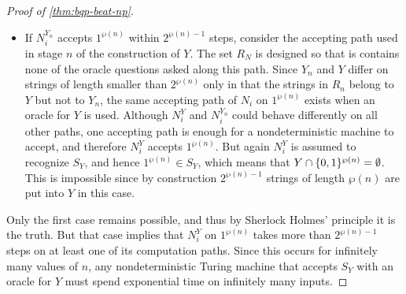 \documentclass[12pt]{article}
\begin{document}
\begin{mdframed}
\begin{proof}[Proof of \cref{thm:bqp-beat-np}]
\begin{itemize}
      which means that $Y \cap \zo^{\wp(n)} \ne \emptyset$. This is impossible
      since by construction no strings of length $\wp(n)$ are put into $Y$ in
      this case.
    \item If $N_i^{Y_n}$ accepts $1^{\wp(n)}$ within $2^{\wp(n)-1}$ steps,
      consider the accepting path used in stage $n$ of the construction of $Y$.
      The set $R_N$ is designed so that is contains none of the oracle questions
      asked along this path. Since $Y_n$ and $Y$ differ on strings of length
      smaller than $2^{\wp(n)}$ only in that the strings in $R_n$ belong to $Y$
      but not to $Y_n$, the same accepting path of $N_i$ on $1^{\wp(n)}$ exists
      when an oracle for $Y$ is used. Although $N_i^Y$ and $N_i^{Y_n}$ could
      behave differently on all other paths, one accepting path is enough for a
      nondeterministic machine to accept, and therefore $N_i^Y$ accepts
      $1^{\wp(n)}$. But again $N_i^Y$ is assumed to recognize $S_Y$, and hence
      $1^{\wp(n)} \in S_Y$, which means that $Y \cap \{0,1\}^{\wp(n)} = \emptyset$.
      This is impossible since by construction $2^{\wp(n)-1}$ strings of length
      $\wp(n)$ are put into $Y$ in this case.
  \end{itemize}
  Only the first case remains possible, and thus by Sherlock Holmes' principle
  it is the truth. But that case implies that $N_i^Y$ on $1^{\wp(n)}$ takes more
  than $2^{\wp(n)-1}$ steps on at least one of its computation paths. Since this
  occurs for infinitely many values of $n$, any nondeterministic Turing machine
  that accepts $S_Y$ with an oracle for $Y$ must spend exponential time on
  infinitely many inputs.
\end{proof}
\end{mdframed}


\nocite{*}


\end{document}
